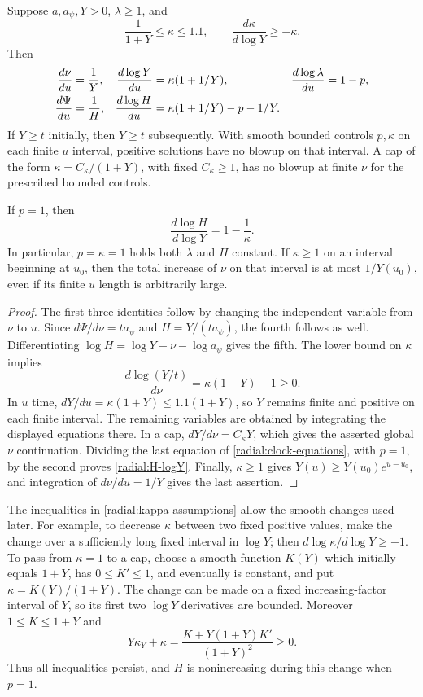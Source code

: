\begin{lemma}\label{radial:odes}
Suppose $a,a_\psi,Y>0$, $\lambda\ge1$, and
\begin{equation}\label{radial:kappa-assumptions}
 \frac1{1+Y}\le\kappa\le1.1,\qquad
 \frac{d\kappa}{d\log Y}\ge-\kappa.
\end{equation}
Then
\begin{align}\label{radial:clock-equations}
 \frac{d\nu}{du}&=\frac1Y,&
 \frac{d\log Y}{du}&=\kappa(1+1/Y),&
 \frac{d\log\lambda}{du}&=1-p,\\
 \frac{d\Psi}{du}&=\frac1H,&
 \frac{d\log H}{du}&=\kappa(1+1/Y)-p-1/Y.\notag
\end{align}
If $Y\ge t$ initially, then $Y\ge t$ subsequently. With smooth bounded controls $p,\kappa$ on each finite $u$ interval, positive solutions have no blowup on that interval. A cap of the form $\kappa=C_\kappa/(1+Y)$, with fixed $C_\kappa\ge1$, has no blowup at finite $\nu$ for the prescribed bounded controls.

If $p=1$, then
\begin{equation}\label{radial:H-logY}
 \frac{d\log H}{d\log Y}=1-\frac1\kappa.
\end{equation}
In particular, $p=\kappa=1$ holds both $\lambda$ and $H$ constant. If $\kappa\ge1$ on an interval beginning at $u_0$, then the total increase of $\nu$ on that interval is at most $1/Y(u_0)$, even if its finite $u$ length is arbitrarily large.
\end{lemma}

\begin{proof}
The first three identities follow by changing the independent variable from $\nu$ to $u$. Since $d\Psi/d\nu=t a_\psi$ and $H=Y/(t a_\psi)$, the fourth follows as well. Differentiating $\log H=\log Y-\nu-\log a_\psi$ gives the fifth. The lower bound on $\kappa$ implies
\[
 \frac{d\log(Y/t)}{d\nu}=\kappa(1+Y)-1\ge0.
\]
In $u$ time, $dY/du=\kappa(1+Y)\le1.1(1+Y)$, so $Y$ remains finite and positive on each finite interval. The remaining variables are obtained by integrating the displayed equations there. In a cap, $dY/d\nu=C_\kappa Y$, which gives the asserted global $\nu$ continuation. Dividing the last equation of \eqref{radial:clock-equations}, with $p=1$, by the second proves \eqref{radial:H-logY}. Finally, $\kappa\ge1$ gives $Y(u)\ge Y(u_0)e^{u-u_0}$, and integration of $d\nu/du=1/Y$ gives the last assertion.
\end{proof}

The inequalities in \eqref{radial:kappa-assumptions} allow the smooth changes used later. For example, to decrease $\kappa$ between two fixed positive values, make the change over a sufficiently long fixed interval in $\log Y$; then $d\log\kappa/d\log Y\ge-1$. To pass from $\kappa=1$ to a cap, choose a smooth function $K(Y)$ which initially equals $1+Y$, has $0\le K'\le1$, and eventually is constant, and put $\kappa=K(Y)/(1+Y)$. The change can be made on a fixed increasing-factor interval of $Y$, so its first two $\log Y$ derivatives are bounded. Moreover $1\le K\le1+Y$ and
\[
 Y\kappa_Y+\kappa
 =\frac{K+Y(1+Y)K'}{(1+Y)^2}\ge0.
\]
Thus all inequalities persist, and $H$ is nonincreasing during this change when $p=1$.

